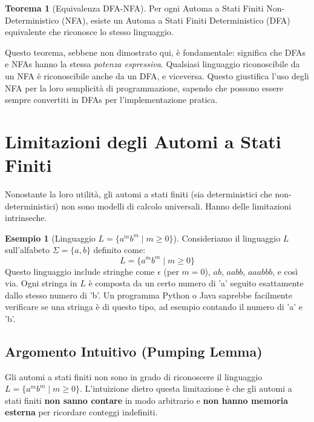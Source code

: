 \documentclass[a4paper]{article}
\theoremstyle{definition} %
\newtheorem{theorem}{Teorema}
[section]
\newtheorem{example}{Esempio}[section]
\begin{document}
\begin{theorem}[Equivalenza DFA-NFA]
Per ogni Automa a Stati Finiti Non-Deterministico (NFA), esiste un Automa a Stati Finiti Deterministico (DFA) equivalente che riconosce lo stesso linguaggio.
\end{theorem}
Questo teorema, sebbene non dimostrato qui, è fondamentale: significa che DFAs e NFAs hanno la stessa \emph{potenza espressiva}. Qualsiasi linguaggio riconoscibile da un NFA è riconoscibile anche da un DFA, e viceversa. Questo giustifica l'uso degli NFA per la loro semplicità di programmazione, sapendo che possono essere sempre convertiti in DFAs per l'implementazione pratica.

\section{Limitazioni degli Automi a Stati Finiti}
Nonostante la loro utilità, gli automi a stati finiti (sia deterministici che non-deterministici) non sono modelli di calcolo universali. Hanno delle limitazioni intrinseche.

\begin{example}[Linguaggio $L = \{a^m b^m \mid m \geq 0\}$]
Consideriamo il linguaggio $L$ sull'alfabeto $\Sigma = \{a, b\}$ definito come:
\[ L = \{a^m b^m \mid m \geq 0\} \]
Questo linguaggio include stringhe come $\epsilon$ (per $m=0$), $ab$, $aabb$, $aaabbb$, e così via. Ogni stringa in $L$ è composta da un certo numero di 'a' seguito esattamente dallo stesso numero di 'b'.
Un programma Python o Java saprebbe facilmente verificare se una stringa è di questo tipo, ad esempio contando il numero di 'a' e 'b'.
\end{example}

\subsection{Argomento Intuitivo (Pumping Lemma)}
Gli automi a stati finiti non sono in grado di riconoscere il linguaggio $L = \{a^m b^m \mid m \geq 0\}$. L'intuizione dietro questa limitazione è che gli automi a stati finiti \textbf{non sanno contare} in modo arbitrario e \textbf{non hanno memoria esterna} per ricordare conteggi indefiniti.
\end{document}
